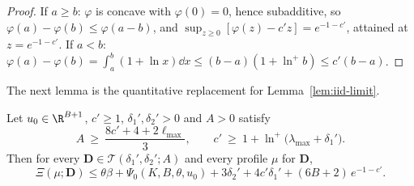 \begin{proof}
If $a\ge b$: $\varphi$ is concave with $\varphi(0)=0$, hence subadditive, so
$\varphi(a)-\varphi(b)\le\varphi(a-b)$, and
$\sup_{z\ge0}[\varphi(z)-c'z]=e^{-1-c'}$, attained at $z=e^{-1-c'}$. If $a<b$:
$\varphi(a)-\varphi(b)=\int_a^b(1+\ln x)\dd x\le(b-a)(1+\ln^+b)\le c'(b-a)$.
\end{proof}

The next lemma is the quantitative replacement for Lemma~\ref{lem:iid-limit}.

\begin{lemma}\label{lem:transfer-Q}
Let $u_0\in\R^{B+1}$, $c'\ge1$, $\delta_1',\delta_2'>0$ and $A>0$ satisfy
\begin{equation}\label{eq:transfer-A}
A\ \ge\ \frac{8c'+4+2\ell_{\max}}{3},\qquad c'\ \ge\ 1+\ln^+\bigl(\lambda_{\max}+\delta_1'\bigr).
\end{equation}
Then for every $\mathbf D\in\mathcal T(\delta_1',\delta_2';A)$ and every profile $\mu$ for
$\mathbf D$,
\[
\Xi(\mu;\mathbf D)\le\theta\beta+\Psi_0(K,B,\theta,u_0)+3\delta_2'+4c'\delta_1'+(6B+2)\,e^{-1-c'}.
\]
\end{lemma}

